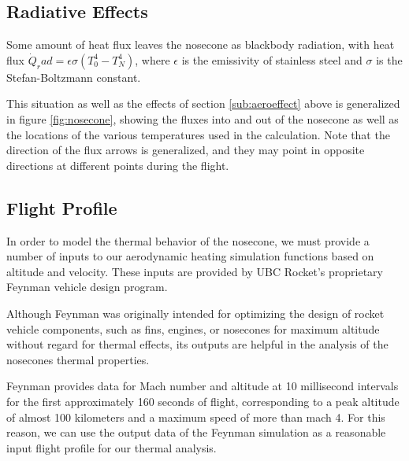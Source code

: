 \documentclass[twocolumn]{article}
\begin{document}
        \subsection{Radiative Effects}
            Some amount of heat flux leaves the nosecone as blackbody radiation,
            with heat flux $\dot{Q}_rad=\epsilon\sigma(T_0^4-T_N^4)$, where
            $\epsilon$ is the emissivity of stainless steel and 
            $\sigma$ is the Stefan-Boltzmann constant.

            This situation as well as the effects of section \ref{sub:aeroeffect}
            above is generalized in figure \ref{fig:nosecone}, showing
            the fluxes into and out of the nosecone as well as the locations of 
            the various temperatures used in the calculation. Note that the 
            direction of the flux arrows is generalized, and they may point in 
            opposite directions at different points during the flight.


        \subsection{Flight Profile}
            In order to model the thermal behavior of the nosecone, we must
            provide a number of inputs to our aerodynamic heating simulation 
            functions based on altitude and velocity. These inputs are provided 
            by UBC Rocket's proprietary Feynman vehicle design program.
            
            Although Feynman was originally intended for optimizing the design
            of rocket vehicle components, such as fins, engines, or nosecones 
            for maximum altitude without regard for thermal effects, its outputs
            are helpful in the analysis of the nosecones thermal properties. 

            Feynman provides data for Mach number and altitude at 10
            millisecond intervals for the first approximately 160 seconds of
            flight, corresponding to a peak altitude of almost 100 kilometers
            and a maximum speed of more than mach 4. 
            For this reason, we can use the output data of the Feynman
            simulation as a reasonable input flight profile for our thermal
            analysis.
\end{document}
